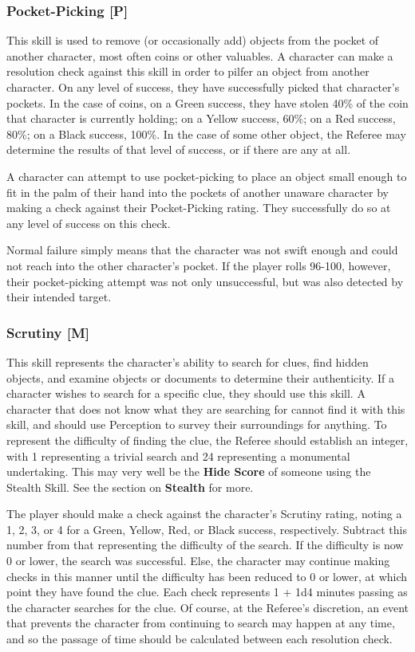 \documentclass[oneside]{book}
\begin{document}
\begin{multicols}{2}
\subsubsection{Pocket-Picking [P]}
This skill is used to remove (or occasionally add) objects from the pocket of another character, most often coins or other valuables. A character can make a resolution check against this skill in order to pilfer an object from another character. On any level of success, they have successfully picked that character's pockets. In the case of coins, on a Green success, they have stolen 40\% of the coin that character is currently holding; on a Yellow success, 60\%; on a Red success, 80\%; on a Black success, 100\%. In the case of some other object, the Referee may determine the results of that level of success, or if there are any at all.

A character can attempt to use pocket-picking to place an object small enough to fit in the palm of their hand into the pockets of another unaware character by making a check against their Pocket-Picking rating. They successfully do so at any level of success on this check.

Normal failure simply means that the character was not swift enough and could not reach into the other character's pocket. If the player rolls 96-100, however, their pocket-picking attempt was not only unsuccessful, but was also detected by their intended target.

\subsubsection{Scrutiny [M]}
This skill represents the character's ability to search for clues, find hidden objects, and examine objects or documents to determine their authenticity. If a character wishes to search for a specific clue, they should use this skill.  A character that does not know what they are searching for cannot find it with this skill, and should use Perception to survey their surroundings for anything. To represent the difficulty of finding the clue, the Referee should establish an integer, with 1 representing a trivial search and 24 representing a monumental undertaking. This may very well be the \textbf{Hide Score} of someone using the Stealth Skill. See the section on \textbf{Stealth} for more.

 The player should make a check against the character's Scrutiny rating, noting a 1, 2, 3, or 4 for a Green, Yellow, Red, or Black success, respectively. Subtract this number from that representing the difficulty of the search. If the difficulty is now 0 or lower, the search was successful. Else, the character may continue making checks in this manner until the difficulty has been reduced to 0 or lower, at which point they have found the clue. Each check represents 1 + 1d4 minutes passing as the character searches for the clue. Of course, at the Referee's discretion, an event that prevents the character from continuing to search may happen at any time, and so the passage of time should be calculated between each resolution check. 


\end{multicols}
\end{document}
